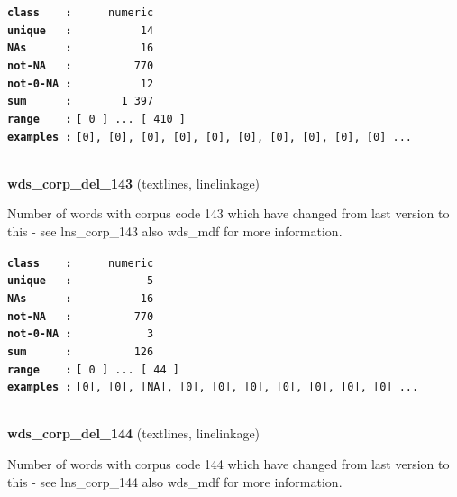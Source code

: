 \documentclass[]{article}
\begin{document}
\textbf{\texttt{class\ \ \ \ :}} \texttt{~~~~~numeric}\\
\textbf{\texttt{unique\ \ \ :}} \texttt{~~~~~~~~~~14}\\
\textbf{\texttt{NAs\ \ \ \ \ \ :}} \texttt{~~~~~~~~~~16}\\
\textbf{\texttt{not-NA\ \ \ :}} \texttt{~~~~~~~~~770}\\
\textbf{\texttt{not-0-NA\ :}} \texttt{~~~~~~~~~~12}\\
\textbf{\texttt{sum\ \ \ \ \ \ :}} \texttt{~~~~~~~1~397}\\
\textbf{\texttt{range\ \ \ \ :}}
\texttt{{[}\ 0\ {]}\ ...\ {[}\ 410\ {]}}\\
\textbf{\texttt{examples\ :}}
\texttt{{[}0{]},\ {[}0{]},\ {[}0{]},\ {[}0{]},\ {[}0{]},\ {[}0{]},\ {[}0{]},\ {[}0{]},\ {[}0{]},\ {[}0{]}\ ...}\\

~

\textbf{wds\_corp\_del\_143} (textlines, linelinkage)

Number of words with corpus code 143 which have changed from last
version to this - see lns\_corp\_143 also wds\_mdf for more information.

\textbf{\texttt{class\ \ \ \ :}} \texttt{~~~~~numeric}\\
\textbf{\texttt{unique\ \ \ :}} \texttt{~~~~~~~~~~~5}\\
\textbf{\texttt{NAs\ \ \ \ \ \ :}} \texttt{~~~~~~~~~~16}\\
\textbf{\texttt{not-NA\ \ \ :}} \texttt{~~~~~~~~~770}\\
\textbf{\texttt{not-0-NA\ :}} \texttt{~~~~~~~~~~~3}\\
\textbf{\texttt{sum\ \ \ \ \ \ :}} \texttt{~~~~~~~~~126}\\
\textbf{\texttt{range\ \ \ \ :}}
\texttt{{[}\ 0\ {]}\ ...\ {[}\ 44\ {]}}\\
\textbf{\texttt{examples\ :}}
\texttt{{[}0{]},\ {[}0{]},\ {[}NA{]},\ {[}0{]},\ {[}0{]},\ {[}0{]},\ {[}0{]},\ {[}0{]},\ {[}0{]},\ {[}0{]}\ ...}\\

~

\textbf{wds\_corp\_del\_144} (textlines, linelinkage)

Number of words with corpus code 144 which have changed from last
version to this - see lns\_corp\_144 also wds\_mdf for more information.
\end{document}
